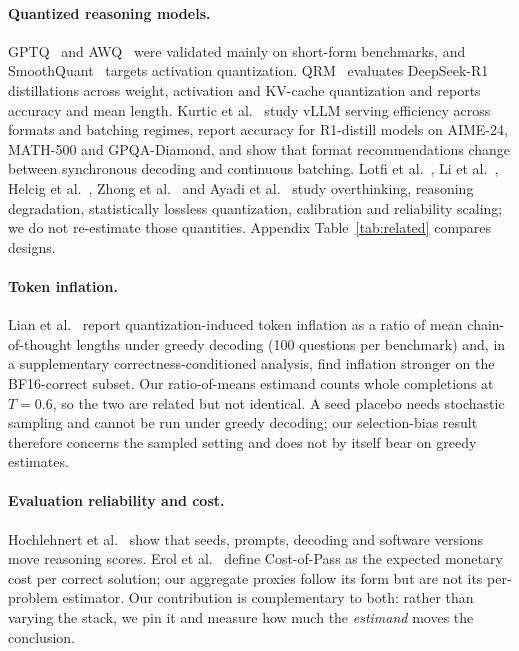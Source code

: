 \documentclass[11pt,a4paper]{article}
\begin{document}
\paragraph{Quantized reasoning models.} GPTQ~\cite{frantar2022gptq} and AWQ~\cite{lin2023awq} were validated mainly on short-form benchmarks, and SmoothQuant~\cite{xiao2023smoothquant} targets activation quantization. QRM~\cite{liu2025qrm} evaluates DeepSeek-R1 distillations across weight, activation and KV-cache quantization and reports accuracy and mean length. Kurtic et al.~\cite{kurtic2025give} study vLLM serving efficiency across formats and batching regimes, report accuracy for R1-distill models on AIME-24, MATH-500 and GPQA-Diamond, and show that format recommendations change between synchronous decoding and continuous batching. Lotfi et al.~\cite{lotfi2026overthinking}, Li et al.~\cite{li2025quantmeets}, Helcig et al.~\cite{helcig2026slq}, Zhong et al.~\cite{zhong2025quantized} and Ayadi et al.~\cite{ayadi2026reliability} study overthinking, reasoning degradation, statistically lossless quantization, calibration and reliability scaling; we do not re-estimate those quantities. Appendix Table~\ref{tab:related} compares designs.

\paragraph{Token inflation.} Lian et al.~\cite{lian2026quantinflates} report quantization-induced token inflation as a ratio of mean chain-of-thought lengths under greedy decoding (100 questions per benchmark) and, in a supplementary correctness-conditioned analysis, find inflation stronger on the BF16-correct subset. Our ratio-of-means estimand counts whole completions at $T=0.6$, so the two are related but not identical. A seed placebo needs stochastic sampling and cannot be run under greedy decoding; our selection-bias result therefore concerns the sampled setting and does not by itself bear on greedy estimates.

\paragraph{Evaluation reliability and cost.} Hochlehnert et al.~\cite{hochlehnert2025sober} show that seeds, prompts, decoding and software versions move reasoning scores. Erol et al.~\cite{erol2025costofpass} define Cost-of-Pass as the expected monetary cost per correct solution; our aggregate proxies follow its form but are not its per-problem estimator. Our contribution is complementary to both: rather than varying the stack, we pin it and measure how much the \emph{estimand} moves the conclusion.
\end{document}
